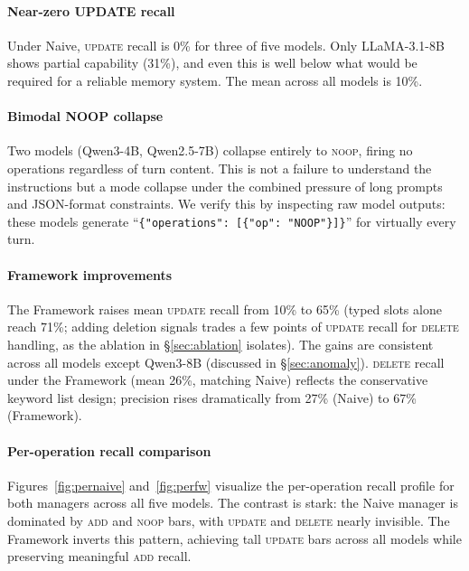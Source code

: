 \documentclass[10pt, twocolumn]{article}
\begin{document}
\paragraph{Near-zero UPDATE recall}
Under Naive, \textsc{update} recall is 0\% for three of five models.
Only LLaMA-3.1-8B shows partial capability (31\%), and even this is well
below what would be required for a reliable memory system.
The mean across all models is 10\%.

\paragraph{Bimodal NOOP collapse}
Two models (Qwen3-4B, Qwen2.5-7B) collapse entirely to \textsc{noop},
firing no operations regardless of turn content.
This is not a failure to understand the instructions but a mode collapse
under the combined pressure of long prompts and JSON-format constraints.
We verify this by inspecting raw model outputs: these models generate
``\texttt{\{"operations": [\{"op": "NOOP"\}]\}}'' for virtually every turn.

\paragraph{Framework improvements}
The Framework raises mean \textsc{update} recall from 10\% to 65\%
(typed slots alone reach 71\%; adding deletion signals trades a few points of
\textsc{update} recall for \textsc{delete} handling, as the ablation in
\S\ref{sec:ablation} isolates).
The gains are consistent across all models except Qwen3-8B
(discussed in \S\ref{sec:anomaly}).
\textsc{delete} recall under the Framework (mean 26\%, matching Naive)
reflects the conservative keyword list design; precision rises dramatically
from 27\% (Naive) to 67\% (Framework).

\paragraph{Per-operation recall comparison}
Figures~\ref{fig:pernaive} and~\ref{fig:perfw} visualize the per-operation
recall profile for both managers across all five models.
The contrast is stark: the Naive manager is dominated by \textsc{add} and
\textsc{noop} bars, with \textsc{update} and \textsc{delete} nearly
invisible. The Framework inverts this pattern, achieving tall
\textsc{update} bars across all models while preserving meaningful
\textsc{add} recall.
\end{document}
